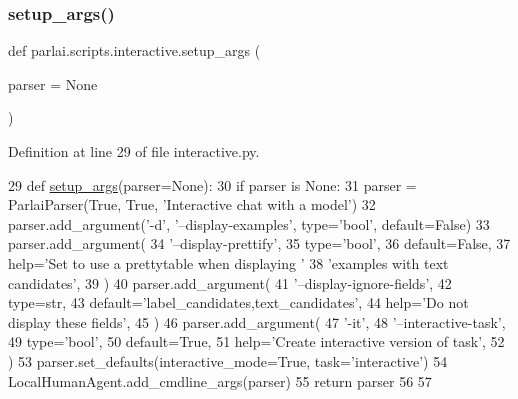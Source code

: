 \subsubsection{\texorpdfstring{setup\+\_\+args()}{setup\_args()}}
{\footnotesize\ttfamily def parlai.\+scripts.\+interactive.\+setup\+\_\+args (\begin{DoxyParamCaption}\item[{}]{parser = {\ttfamily None} }\end{DoxyParamCaption})}



Definition at line 29 of file interactive.\+py.


\begin{DoxyCode}
29 \textcolor{keyword}{def }\hyperlink{namespaceprojects_1_1self__feeding_1_1interactive_a2ad3b874d9caef6e76ea41e029b933f0}{setup\_args}(parser=None):
30     \textcolor{keywordflow}{if} parser \textcolor{keywordflow}{is} \textcolor{keywordtype}{None}:
31         parser = ParlaiParser(\textcolor{keyword}{True}, \textcolor{keyword}{True}, \textcolor{stringliteral}{'Interactive chat with a model'})
32     parser.add\_argument(\textcolor{stringliteral}{'-d'}, \textcolor{stringliteral}{'--display-examples'}, type=\textcolor{stringliteral}{'bool'}, default=\textcolor{keyword}{False})
33     parser.add\_argument(
34         \textcolor{stringliteral}{'--display-prettify'},
35         type=\textcolor{stringliteral}{'bool'},
36         default=\textcolor{keyword}{False},
37         help=\textcolor{stringliteral}{'Set to use a prettytable when displaying '}
38         \textcolor{stringliteral}{'examples with text candidates'},
39     )
40     parser.add\_argument(
41         \textcolor{stringliteral}{'--display-ignore-fields'},
42         type=str,
43         default=\textcolor{stringliteral}{'label\_candidates,text\_candidates'},
44         help=\textcolor{stringliteral}{'Do not display these fields'},
45     )
46     parser.add\_argument(
47         \textcolor{stringliteral}{'-it'},
48         \textcolor{stringliteral}{'--interactive-task'},
49         type=\textcolor{stringliteral}{'bool'},
50         default=\textcolor{keyword}{True},
51         help=\textcolor{stringliteral}{'Create interactive version of task'},
52     )
53     parser.set\_defaults(interactive\_mode=\textcolor{keyword}{True}, task=\textcolor{stringliteral}{'interactive'})
54     LocalHumanAgent.add\_cmdline\_args(parser)
55     \textcolor{keywordflow}{return} parser
56 
57 
\end{DoxyCode}


